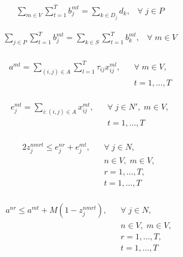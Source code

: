 \documentclass[conference]{IEEEtran}
\begin{document}
\begin{equation}
    \begin{split}
        \sum_{m \in V}\sum_{t=1}^{T} b_{j}^{mt} = \sum_{k \in D_{j}}d_{k}, \;\;\; \forall \; j \in P\label{eq12}
    \end{split}
\end{equation}

\begin{equation}
    \begin{split}
        \sum_{j \in P}\sum_{t=1}^{T}b_{j}^{mt} = \sum_{k \in S}\sum_{t=1}^{T}b_{k}^{mt}, \;\;\; \forall \;m \in V\\\label{eq13}
    \end{split}
\end{equation}

\begin{equation}
    \begin{split}
        a^{mt} = \sum_{(i, j)  \in A}\sum_{l=1}^{T}\tau_{ij}x_{ij}^{ml}, \;\;\;& \forall \; m \in V, \;\\&t=1, \dots, T\\\label{eq14}
    \end{split}
\end{equation}

\begin{equation}
    \begin{split}
        e_{j}^{mt} = \sum_{i:(i, j) \in A}x_{ij}^{mt}, \;\;\; &\forall\; j \in N', \; m \in V, \\&t=1, \dots, T\\\label{eq15}
    \end{split}
\end{equation}

\begin{equation}
    \begin{split}
        2 z_{j}^{nmrt} \leq e_{j}^{nr} + e_{j}^{mt}, \;\;\; &\forall \; j \in N, \; \\& n \in V, \; m \in V, \;\\& r=1, \dots, T, \;\\& t=1, \dots, T\\\label{eq16}
    \end{split}
\end{equation}

\begin{equation}
    \begin{split}
        a^{nr} \leq a^{mt} + M (1 - z_{j}^{nmrt}), \;\;\;&\forall \; j \in N, \; \\&n \in V, \; m \in V, \;\\& r=1, \dots, T, \;\\& t=1, \dots, T\\\label{eq17}
    \end{split}
\end{equation}
\end{document}
